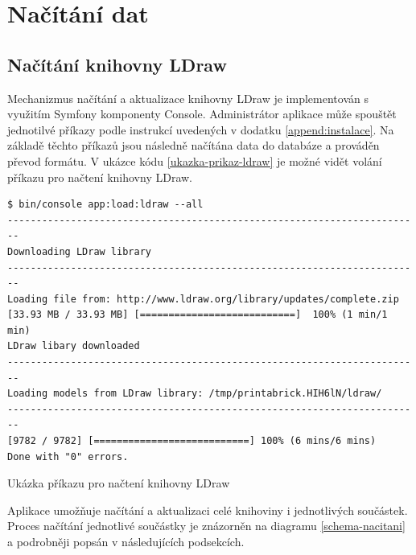 \section{Načítání dat}

\subsection{Načítání knihovny LDraw}
Mechanizmus načítání a aktualizace knihovny LDraw je implementován s využitím Symfony komponenty Console. Administrátor aplikace může spouštět jednotilvé příkazy podle instrukcí uvedených v dodatku \ref{append:instalace}. Na základě těchto příkazů jsou následně načítána data do databáze a prováděn převod formátu. V ukázce kódu \ref{ukazka-prikaz-ldraw} je možné vidět volání příkazu pro načtení knihovny LDraw.

\begin{listing}[htbp]
        \begin{verbatim}
$ bin/console app:load:ldraw --all
------------------------------------------------------------------------
Downloading LDraw library
------------------------------------------------------------------------
Loading file from: http://www.ldraw.org/library/updates/complete.zip
[33.93 MB / 33.93 MB] [===========================]  100% (1 min/1 min)
LDraw libary downloaded
------------------------------------------------------------------------
Loading models from LDraw library: /tmp/printabrick.HIH6lN/ldraw/
------------------------------------------------------------------------
[9782 / 9782] [===========================] 100% (6 mins/6 mins) 
Done with "0" errors.
        \end{verbatim}
    \caption{Ukázka příkazu pro načtení knihovny LDraw\label{ukazka-prikaz-ldraw}}
\end{listing}

Aplikace umožňuje načítání a aktualizaci celé knihoviny i jednotlivých součástek. Proces načítání jednotlivé součástky je znázorněn na diagramu \ref{schema-nacitani} a podrobněji popsán v následujících podsekcích.

